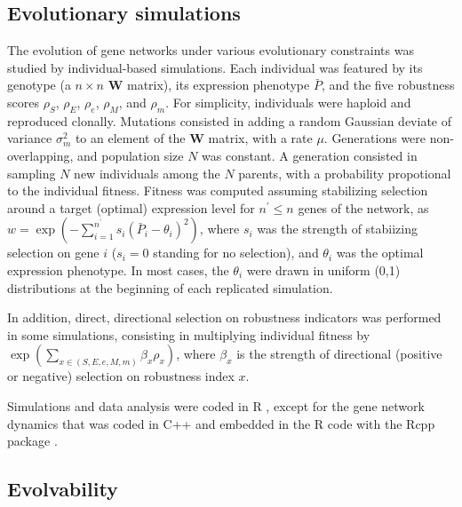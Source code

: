 \documentclass[a4paper]{article}
\newcommand{\stability}{{\rho_S}}
\newcommand{\earlyenv}{{\rho_E}}
\newcommand{\lateenv}{{\rho_e}}
\newcommand{\earlymut}{{\rho_M}}
\newcommand{\latemut}{{\rho_m}}
\begin{document}
\subsection{Evolutionary simulations}

The evolution of gene networks under various evolutionary constraints was studied by individual-based simulations. Each individual was featured by its genotype (a $n \times n$ $\bm W$ matrix), its expression phenotype $\bar P$, and the five robustness scores $\stability$, $\earlyenv$, $\lateenv$, $\earlymut$, and $\latemut$. For simplicity, individuals were haploid and reproduced clonally. Mutations consisted in adding a random Gaussian deviate of variance $\sigma_m^2$ to an element of the $\bm W$ matrix, with a rate $\mu$. Generations were non-overlapping, and population size $N$ was constant. A generation consisted in sampling $N$ new individuals among the $N$ parents, with a probability propotional to the individual fitness. Fitness was computed assuming stabilizing selection around a target (optimal) expression level for $n^\prime \leq n$ genes of the network, as $w = \exp(- \sum_{i=1}^{n^\prime} s_i (\bar P_i - \theta_i)^2 )$, where $s_i$ was the strength of stabiizing selection on gene $i$ ($s_i = 0$ standing for no selection), and $\theta_i$ was the optimal expression phenotype. In most cases, the $\theta_i$ were drawn in uniform (0,1) distributions at the beginning of each replicated simulation. 

In addition, direct, directional selection on robustness indicators was performed in some simulations, consisting in multiplying individual fitness by $\exp ( \sum_{x \in (S, E, e, M, m)} \beta_x \rho _x )$, where $\beta_x$ is the strength of directional (positive or negative) selection on robustness index $x$. 

Simulations and data analysis were coded in R \citep{R20}, except for the gene network dynamics that was coded in C++ and embedded in the R code with the Rcpp package \citep{EF11}. 

\subsection{Evolvability}
\end{document}
